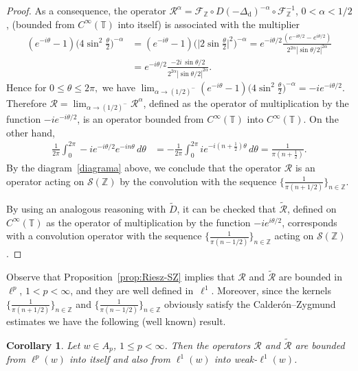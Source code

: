 \documentclass[11pt]{amsart}
\numberwithin{equation}{section}
\newcommand{\Z}{\mathbb{Z}}
\newcommand{\T}{\mathbb{T}}
\newcommand{\dis}{\mathrm{d}}
\theoremstyle{plain}
\newtheorem{coro}{Corollary}
\theoremstyle{remark}
\begin{document}
\begin{proof}
As a consequence, the operator  $\mathcal{R}^\alpha = \mathcal{F}_{\Z}\circ D (-\Delta_{\dis})^{-\alpha} \circ \mathcal{F}^{-1}_{\Z}$, $0< \alpha < 1/2$, (bounded from
$C^\infty(\T)$ into itself) is associated with the multiplier
\begin{align*}
(e^{-i\theta}-1)\Big(4\sin^2\frac{\theta}{2}\Big)^{-\alpha} &=
(e^{-i\theta}-1)\Big(\Big|2\sin \frac{\theta}{2}\Big|^2 \Big)^{-\alpha}
= e^{-i\theta/2} \frac{(e^{-i\theta/2}-e^{i\theta/2})}
{2^{2\alpha} |\sin\theta/2|^{2\alpha}}\\
&= e^{-i\theta/2} \frac{-2i\, \sin\theta/2}{2^{2\alpha} |\sin\theta/2|^{2\alpha}} .
\end{align*}
Hence  for $0\le \theta \le 2\pi,$
we have
$\lim_{\alpha \to (1/2)^{-}} (e^{-i\theta}-1)\Big(4\sin^2\frac{\theta}{2}\Big)^{-\alpha} = -ie^{-i\theta/2}$.
Therefore $\mathcal{R} = \lim_{\alpha \to (1/2)^{-}} \mathcal{R}^\alpha$, defined as the operator of multiplication by the function $-ie^{-i\theta/2}$,
is an operator bounded from $C^\infty(\T)$ into  $C^\infty(\T).$
On the other hand,
\begin{align*}
\frac1{2\pi} \int_{0}^{2\pi} -ie^{-i \theta/2} e^{-in\theta} \,d\theta
&= -\frac1{2\pi} \int_{0}^{2\pi } ie^{-i(n+\frac12)\theta} \,d\theta
= \frac1{\pi(n+\frac12)} .
\end{align*}
By the diagram~\eqref{diagrama} above, we conclude that the operator  $\mathcal{R}$ is an operator acting on $\mathcal{S}(\Z)$ by the convolution with the sequence $\big \{ \frac1{\pi(n+1/2)} \big \}_{n\in \Z}$.

By using an analogous reasoning with $\widetilde{D}$, it can be checked that $\widetilde{\mathcal{R}}$, defined on $C^{\infty}(\T)$ as the operator of multiplication by the function $-ie^{i\theta/2}$, corresponds with a convolution operator  with the sequence $\big \{ \frac1{\pi(n-1/2)} \big \}_{n\in \Z}$ acting on $\mathcal{S}(\Z)$.
 \end{proof}

Observe that Proposition~\ref{prop:Riesz-SZ} implies that  $\mathcal{R}$ and $\widetilde{\mathcal{R}}$ are bounded in $\ell^p$, $1 < p< \infty$, and they are well defined in~$\ell^1$. Moreover, since the kernels $\big \{ \frac1{\pi(n+1/2)} \big \}_{n\in\Z}$ and $\big \{ \frac1{\pi(n-1/2)} \big \}_{n\in\Z}$ obviously satisfy the Calder\'on--Zygmund estimates we have the following (well known) result.

\begin{coro}
\label{discreteriesz}
Let $w \in A_p$, $1\le p < \infty$. Then the operators $\mathcal{R}$ and $\widetilde{\mathcal{R}}$ are bounded from
$\ell^p(w)$ into itself and also from $\ell^1(w)$ into weak-$\ell^1(w)$.
\end{coro}
\end{document}
